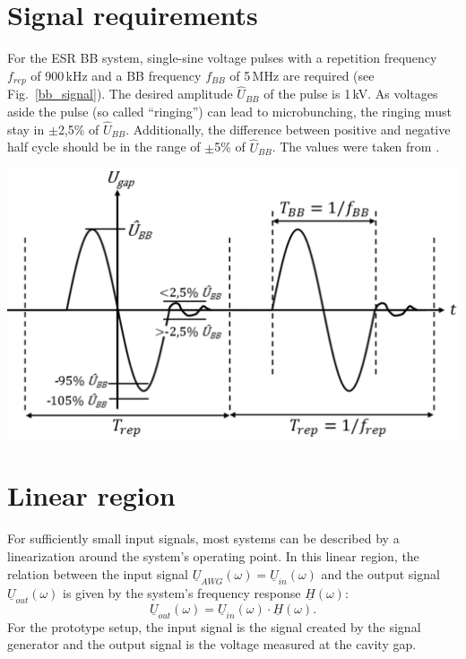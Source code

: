\documentclass[a4paper,
              ]{jacow}
\begin{document}
	  
	
	
	\section{Signal requirements}
	
	For the ESR BB system, single-sine voltage pulses with a repetition frequency $f_{rep}$ of 900\,kHz and a BB frequency $f_{BB}$ of 5\,MHz are required 
	(see Fig.~\ref{bb_signal}). The desired amplitude $\hat{U}_{BB}$ of the pulse is 1\,kV. As voltages aside the pulse (so called ``ringing'') can 
	lead to microbunching, the ringing must	stay in $\pm$2,5\% of $\hat{U}_{BB}$. Additionally, the difference between positive and negative half cycle 
	should be in the range of $\pm$5\% of $\hat{U}_{BB}$. The values were taken from \cite{SIS100_spec}.
	
	 \includegraphics[scale=0.42]{WEPVA047f1.eps}
	  \label{bb_signal}
	  
	 \section{Linear region}
	For sufficiently small input signals, most systems can be described by a linearization around the system's operating point.
	In this linear region, the relation between the input signal $\underline{U}_{AWG}(\omega)=\underline{U}_{in}(\omega)$ and the output signal 
	$\underline{U}_{out}(\omega)$ is given by the system's frequency response $\underline{H}(\omega)$:
	\begin{equation}
	 \underline{U}_{out}(\omega)=\underline{U}_{in}(\omega)\cdot\underline{H}(\omega).
	 \label{H}
	\end{equation}
	For the prototype setup, the input signal is the signal created by the signal generator and the output signal is the voltage measured at the cavity gap.
	
\end{document}
